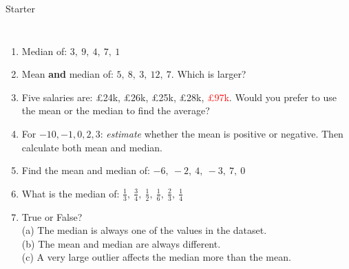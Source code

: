 \documentclass{beamer}
\newcommand{\ashow}[1]{\uncover<2->{\textcolor{red}{\small #1}}}
\newcommand{\ashowq}[1]{\alt<2->{\textcolor{red}{\small #1}}{?}}
\begin{document}
\begin{frame}{Starter}
\begin{columns}[T]
\footnotesize
\vspace{0.3em}
\begin{enumerate}\itemsep1pt
  \vspace{-1em}
  \item Median of: $3,\ 9,\ 4,\ 7,\ 1$ \ashow{4}
  \item Mean \textbf{and} median of: $5,\ 8,\ 3,\ 12,\ 7$. Which is larger? \ashow{equal (both $7$)}
  \item Five salaries are: £24k, £26k, £25k, £28k, \textcolor{red}{£97k}. Would you prefer to use the mean or the median to find the average? \ashow{the median}
  \item For $-10,-1,0,2,3$: \textit{estimate} whether the mean is positive or negative. Then calculate both mean and median. \ashow{negative: mean $-1.2$; median $0$}
  \item Find the mean and median of: $-6,\ -2,\ 4,\ -3,\ 7,\ 0$ \ashow{mean $0$; median $-1$}
  \item What is the median of: $\frac{1}{3},\ \frac{3}{4},\ \frac{1}{2},\ \frac{1}{6},\ \frac{2}{3},\ \frac{1}{4}$ \ashow{$\frac{5}{12}$}
  \item True or False?\\
    (a) The median is always one of the values in the dataset. \ashow{False}\\
    (b) The mean and median are always different. \ashow{False}\\
    (c) A very large outlier affects the median more than the mean. \ashow{False}

\end{enumerate}

\end{columns}
\end{frame}
\end{document}
